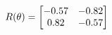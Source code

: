 \documentclass[preview]{standalone}
\begin{document}
\begin{align*}
\special{dvisvgm:raw <g id='unique000'>}R(\theta) = \begin{bmatrix}-0.57 & -0.82\\0.82 & -0.57\end{bmatrix}\special{dvisvgm:raw </g>}
\end{align*}
\end{document}
